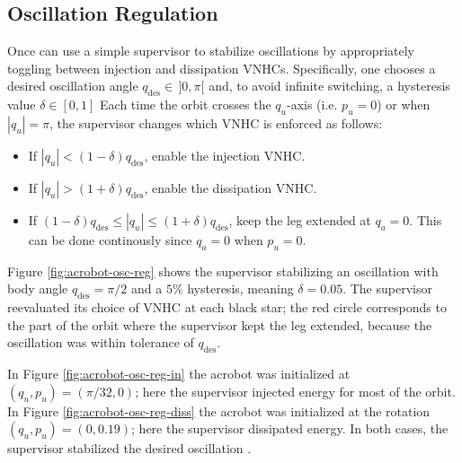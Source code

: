 \documentclass[journal,twoside,web]{ieeecolor}
\begin{document}
\subsection{Oscillation Regulation}

Once can use a simple supervisor to stabilize oscillations by appropriately
toggling between injection and dissipation VNHCs.
Specifically, one chooses a desired oscillation angle 
\(q_\text{des} \in \, ]0,\pi[\) and, to avoid infinite switching, a
hysteresis value \(\delta \in [0,1]\) 
Each time the orbit crosses the \(q_u\)-axis (i.e. \(p_u = 0\)) or 
when \(|q_u| = \pi\), the supervisor changes which VNHC is enforced as follows:
\begin{itemize}
    \item If \(|q_u| < (1-\delta)q_\text{des}\), enable the injection VNHC.
    \item If \(|q_u| > (1+\delta)q_\text{des}\), enable the dissipation VNHC.
    \item If \((1-\delta)q_\text{des} \leq |q_u| \leq (1+\delta)q_\text{des}\),
        keep the leg extended at \(q_a = 0\). This can be done continously since
        \(q_a = 0\) when \(p_u = 0\).
\end{itemize}

Figure \ref{fig:acrobot-osc-reg} shows the supervisor stabilizing an
oscillation with body angle \(q_\text{des} = \pi/2\) and a 
\(5\%\) hysteresis, meaning \(\delta = 0.05\).
The supervisor reevaluated its choice of VNHC at each black star;  
the red circle corresponds to the part of the orbit where the supervisor kept
the leg extended, because the oscillation was within tolerance of
\(q_\text{des}\).

In Figure \ref{fig:acrobot-osc-reg-in} the acrobot was initialized at 
\((q_u,p_u) = (\pi/32,0)\); here the supervisor injected energy for most of the
orbit.
In Figure \ref{fig:acrobot-osc-reg-diss} the acrobot was initialized at the rotation
\((q_u,p_u) = (0,0.19)\); here the supervisor dissipated energy. 
In both cases, the supervisor stabilized the desired oscillation .
\end{document}

